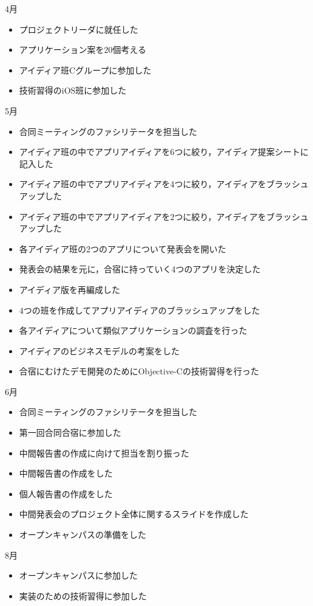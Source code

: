 4月
\begin{itemize}
\item プロジェクトリーダに就任した
\item アプリケーション案を20個考える
\item アイディア班Cグループに参加した
\item 技術習得のiOS班に参加した
\end{itemize}
5月
\begin{itemize}
\item 合同ミーティングのファシリテータを担当した
\item アイディア班の中でアプリアイディアを6つに絞り，アイディア提案シートに記入した
\item アイディア班の中でアプリアイディアを4つに絞り，アイディアをブラッシュアップした
\item アイディア班の中でアプリアイディアを2つに絞り，アイディアをブラッシュアップした
\item 各アイディア班の2つのアプリについて発表会を開いた
\item 発表会の結果を元に，合宿に持っていく4つのアプリを決定した
\item アイディア版を再編成した
\item 4つの班を作成してアプリアイディアのブラッシュアップをした
\item 各アイディアについて類似アプリケーションの調査を行った
\item アイディアのビジネスモデルの考案をした
\item 合宿にむけたデモ開発のためにObjective-Cの技術習得を行った
\end{itemize}
6月
\begin{itemize}
\item 合同ミーティングのファシリテータを担当した
\item 第一回合同合宿に参加した
\item 中間報告書の作成に向けて担当を割り振った
\item 中間報告書の作成をした
\item 個人報告書の作成をした
\item 中間発表会のプロジェクト全体に関するスライドを作成した
\item オープンキャンパスの準備をした
\end{itemize}
8月
\begin{itemize}
\item オープンキャンパスに参加した
\item 実装のための技術習得に参加した
\end{itemize}
